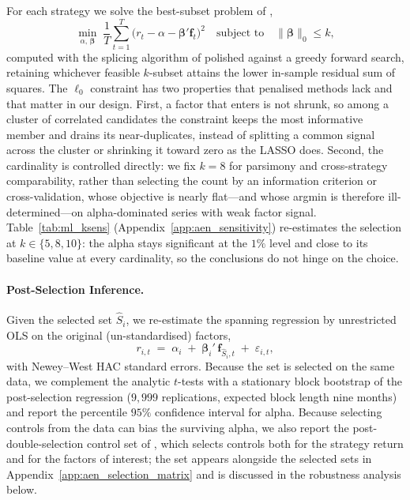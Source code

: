 For each strategy we solve the best-subset problem of
\citet{bertsimas2016best},
\begin{equation}\label{eq:best_subset}
\min_{\alpha,\,\boldsymbol{\beta}}\;
\frac{1}{T}\sum_{t=1}^{T}\bigl(r_t - \alpha -
\boldsymbol{\beta}'\mathbf{f}_t\bigr)^2
\quad \text{subject to} \quad
\|\boldsymbol{\beta}\|_0 \le k,
\end{equation}
computed with the splicing algorithm of \citet{zhu2020polynomial}
polished against a greedy forward search, retaining whichever feasible
$k$-subset attains the lower in-sample residual sum of squares. The $\ell_0$ constraint has two properties
that penalised methods lack and that matter in our design. First, a
factor that enters is not shrunk, so among a cluster of correlated
candidates the constraint keeps the most informative member and drains
its near-duplicates, instead of splitting a common signal across the
cluster or shrinking it toward zero as the LASSO does. Second, the
cardinality is controlled directly: we fix $k = 8$ for parsimony and
cross-strategy comparability, rather than selecting the count by an
information criterion or cross-validation, whose objective is nearly
flat---and whose argmin is therefore ill-determined---on
alpha-dominated series with weak factor signal.
Table~\ref{tab:ml_ksens} (Appendix~\ref{app:aen_sensitivity})
re-estimates the selection at $k \in \{5, 8, 10\}$: the alpha stays
significant at the $1\%$ level and close to its baseline value at every
cardinality, so the conclusions do not hinge on the choice.

\paragraph{Post-Selection Inference.}

Given the selected set $\hat{S}_i$, we re-estimate the spanning
regression by unrestricted OLS on the original (un-standardised)
factors,
\begin{equation}\label{eq:post_ols}
r_{i,t} \;=\; \alpha_i \;+\; \boldsymbol{\beta}_i'\,
\mathbf{f}_{\hat{S}_i,t} \;+\; \varepsilon_{i,t},
\end{equation}
with Newey--West HAC standard errors. Because the set is selected
on the same data, we complement the analytic $t$-tests with a
stationary block bootstrap \citep{politis1994stationary} of the
post-selection regression ($9{,}999$ replications, expected block
length nine months) and report the percentile $95\%$ confidence
interval for alpha. Because selecting controls from the data can bias
the surviving alpha, we also report the post-double-selection control
set of \citet{belloni2014inference}, which selects controls both for
the strategy return and for the factors of interest; the set appears
alongside the selected sets in Appendix~\ref{app:aen_selection_matrix}
and is discussed in the robustness analysis below.

